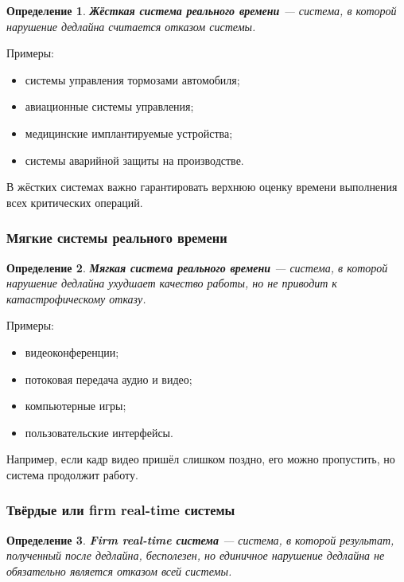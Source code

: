 \documentclass[12pt,a4paper]{article}
\newtheorem{definition}{Определение}
\begin{document}
\begin{definition}
\textbf{Жёсткая система реального времени} --- система, в которой нарушение дедлайна считается отказом системы.
\end{definition}

Примеры:
\begin{itemize}
    \item системы управления тормозами автомобиля;
    \item авиационные системы управления;
    \item медицинские имплантируемые устройства;
    \item системы аварийной защиты на производстве.
\end{itemize}

В жёстких системах важно гарантировать верхнюю оценку времени выполнения всех критических операций.

\subsubsection{Мягкие системы реального времени}

\begin{definition}
\textbf{Мягкая система реального времени} --- система, в которой нарушение дедлайна ухудшает качество работы, но не приводит к катастрофическому отказу.
\end{definition}

Примеры:
\begin{itemize}
    \item видеоконференции;
    \item потоковая передача аудио и видео;
    \item компьютерные игры;
    \item пользовательские интерфейсы.
\end{itemize}

Например, если кадр видео пришёл слишком поздно, его можно пропустить, но система продолжит работу.

\subsubsection{Твёрдые или firm real-time системы}

\begin{definition}
\textbf{Firm real-time система} --- система, в которой результат, полученный после дедлайна, бесполезен, но единичное нарушение дедлайна не обязательно является отказом всей системы.
\end{definition}
\end{document}
